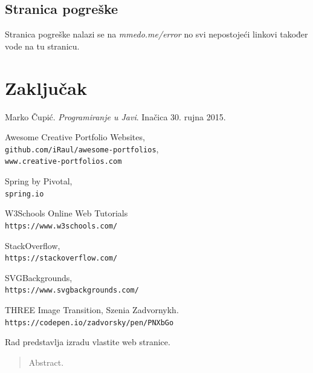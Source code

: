 \documentclass[times, utf8, zavrsni, numeric]{fer}
\begin{document}
\section{Stranica pogreške}
\qquad Stranica pogreške nalazi se na \textit{mmedo.me/error} no svi nepostojeći linkovi također vode na tu stranicu.

\chapter{Zaključak}



\begin{thebibliography}{9}
				Marko Čupić.
				\textit{Programiranje u Javi}.
				Inačica 30. rujna 2015.

				Awesome Creative Portfolio Websites,
				\\\texttt{github.com/iRaul/awesome-portfolios},
				\\\texttt{www.creative-portfolios.com}

				Spring by Pivotal,
				\\\texttt{spring.io}

				W3Schools Online Web Tutorials
				\\\texttt{https://www.w3schools.com/}

				StackOverflow,
				\\\texttt{https://stackoverflow.com/}

				SVGBackgrounds,
				\\\texttt{https://www.svgbackgrounds.com/}

				THREE Image Transition,
				Szenia Zadvornykh.
				\texttt{https://codepen.io/zadvorsky/pen/PNXbGo}

\bibitem{}
\bibitem{}
\bibitem{}
\bibitem{}
\bibitem{}
\bibitem{}
\end{thebibliography}

\begin{sazetak}
\qquad Rad predstavlja izradu vlastite web stranice.

\end{sazetak}

\begin{abstract}
Abstract.

\end{abstract}
\end{document}
